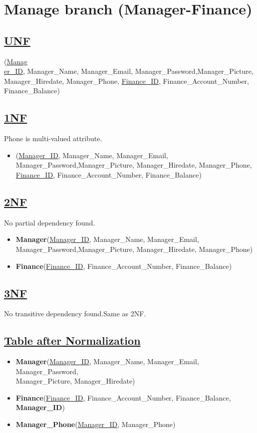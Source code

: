 \section{\texorpdfstring{\centering Manage branch (Manager-Finance)}{Manage branch (Manager-Finance)}}

\subsection*{\underline{UNF}}

(\underline{Manag\\er\_ID}, Manager\_Name, Manager\_Email, Manager\_Password,Manager\_Picture, Manager\_Hiredate, Manager\_Phone,
\underline{Finance\_ID}, Finance\_Account\_Number, Finance\_Balance)

\subsection*{\underline{1NF}}
Phone is multi-valued attribute.
\vskip 0.2in

\begin{itemize}
    \item
          (\underline{Manager\_ID}, Manager\_Name, Manager\_Email, Manager\_Password,Manager\_Picture, Manager\_Hiredate, Manager\_Phone,
          \underline{Finance\_ID}, Finance\_Account\_Number, Finance\_Balance)
\end{itemize}

\subsection*{\underline{2NF}}
No partial dependency found.
\begin{itemize}
    \item \textbf{Manager}(\underline{Manager\_ID}, Manager\_Name, Manager\_Email, Manager\_Password,Manager\_Picture, Manager\_Hiredate, Manager\_Phone)
    \item \textbf{Finance}(\underline{Finance\_ID}, Finance\_Account\_Number, Finance\_Balance)
\end{itemize}

\subsection*{\underline{3NF}}
No transitive dependency found.Same as 2NF.

\subsection*{\underline{Table after Normalization}}
\begin{itemize}
    \item \textbf{Manager}(\underline{Manager\_ID}, Manager\_Name, Manager\_Email, Manager\_Password,\\Manager\_Picture, Manager\_Hiredate)
    \item \textbf{Finance}(\underline{Finance\_ID}, Finance\_Account\_Number, Finance\_Balance,\textbf{ Manager\_ID})
    \item \textbf{Manager\_Phone}(\underline{Manager\_ID}, Manager\_Phone)
\end{itemize}